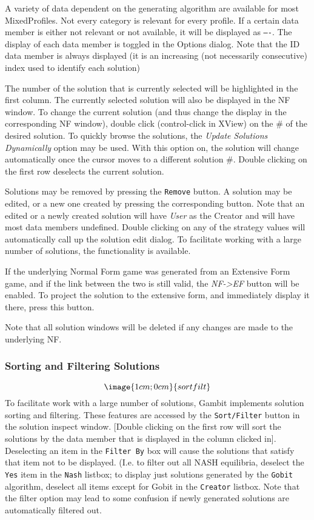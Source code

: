 A variety of data dependent on the generating algorithm are available for most
 MixedProfiles. Not every category is relevant for every profile.  If a
certain data member is either not relevant or not available, it will be 
displayed as {\tt ----}.  The display of each data member is toggled in the
Options dialog.  Note that the ID data member is always displayed (it is
an increasing (not necessarily consecutive) index used to identify each
solution)

The number of the solution that is currently selected will be highlighted in the first
column.  The currently selected solution will also be displayed in the NF window.  
To change the current solution (and thus change the display in the 
corresponding NF window), double click (control-click in XView) on the \# of the
desired solution.  To quickly browse the solutions, the 
{\em Update Solutions Dynamically} 
option may be used.  With this option on, the solution will change automatically once
the cursor moves to a different solution \#.  Double clicking on the first
row deselects the current solution.

Solutions may be removed by pressing the {\tt Remove} button.  A solution may
be edited, or a new one created by pressing the corresponding button.  Note 
that an edited or a newly created solution will have {\em User} as the
Creator and will have most data members undefined.  Double clicking on any
of the strategy values will automatically call up the solution edit dialog.
To facilitate working with a large number of solutions, 
the  functionality is available.

If the underlying Normal Form game was generated from an Extensive Form game, 
and if the link between the two is still 
valid, the {\em NF->EF} button will be enabled.  To project the solution to the 
extensive form, and immediately display it there, press this button.

Note that all solution windows will be deleted if any changes are 
made to the underlying NF.


\subsubsection{Sorting and Filtering Solutions}\label{SolnSortFilt}
$$\image{1cm;0cm}{sortfilt}$$
To facilitate work with a large number of solutions, Gambit implements solution
sorting and filtering.  These features are accessed by the {\tt Sort/Filter} button
in the solution inspect window.
[Double clicking on the first row will sort the solutions by the data member
that is displayed in the column clicked in].  Deselecting an item in the
{\tt Filter By} box will cause the solutions that satisfy that item not to
be displayed.  (I.e. to filter out all NASH equilibria, deselect the {\tt Yes} item
in the {\tt Nash} listbox; to display just solutions generated by the {\tt Gobit}
 algorithm, deselect all items except for Gobit in the {\tt Creator} listbox.
Note that the filter option may lead to some confusion if newly generated 
solutions are automatically filtered out.


